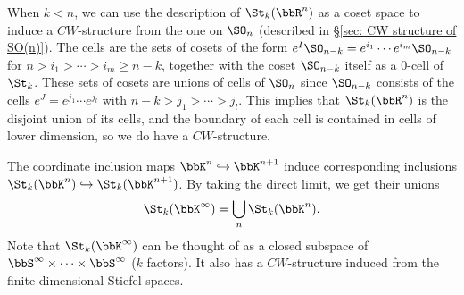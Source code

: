 When $k<n$, we can use the description of $\St_k(\bbR^n)$ as a coset space to induce a $CW$-structure from the one on $\SO_n$ (described in \S\ref{sec: CW structure of SO(n)}). The cells are the sets of cosets of the form $e^I\SO_{n-k}=e^{i_1}\cdots e^{i_m}\SO_{n-k}$ for $n>i_1>\cdots >i_m\geq n-k$, together with the coset $\SO_{n-k}$ itself as a $0$-cell of $\St_k$. These sets of cosets are unions of cells of $\SO_n$ since $\SO_{n-k}$ consists of the cells $e^J=e^{j_1}\cdots e^{j_l}$ with $n-k>j_1>\cdots >j_l$. This implies that $\St_k(\bbR^n)$ is the disjoint union of its cells, and the boundary of each cell is contained in cells of lower dimension, so we do have a $CW$-structure.


\begin{defn}
    The coordinate inclusion maps $\bbK^n\hookrightarrow \bbK^{n+1}$ induce corresponding inclusions $\St_k(\bbK^n)\hookrightarrow \St_k(\bbK^{n+1})$. By taking the direct limit, we get their unions
    \[\St_k(\bbK^\infty)=\bigcup_n \St_k(\bbK^n).\]
    Note that $\St_k(\bbK^\infty)$ can be thought of as a closed subspace of $\bbS^\infty\times\cdots\times \bbS^\infty$ ($k$ factors). It also has a $CW$-structure induced from the finite-dimensional Stiefel spaces.
\end{defn}




